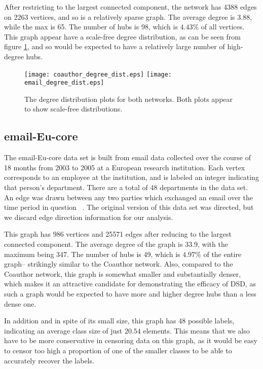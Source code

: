 After restricting to the largest connected component, the network has 4388 edges on 2263 vertices,
and so is a relatively sparse graph. The average degree is 3.88, while the max is 65. The number of
hubs is 98, which is $4.43\%$ of all vertices. This graph appear have a scale-free degree
distribution, as can be seen from figure \ref{fig:real_world_degree_dist}, and so would be expected
to have a relatively large number of high-degree hubs.

\begin{figure}
  \centering
  \texttt{[image: coauthor\_degree\_dist.eps]}
  \texttt{[image: email\_degree\_dist.eps]}
  \caption{The degree distribution plots for both networks. Both plots appear to show scale-free
    distributions.}
  \label{fig:real_world_degree_dist}
\end{figure}


\subsection{email-Eu-core}

The email-Eu-core data set is built from email data collected over the course of 18 months from 2003
to 2005 at a European research institution. Each vertex corresponds to an employee at the
institution, and is labeled an integer indicating that person's department. There are a total of 48
departments in the data set. An edge was drawn between any two parties which exchanged an email over
the time period in question ~\cite{snapnets}. The original version of this data set was directed,
but we discard edge direction information for our analysis.

This graph has 986 vertices and 25571 edges after reducing to the largest connected component. The
average degree of the graph is 33.9, with the maximum being 347. The number of hubs is 49, which is
$4.97\%$ of the entire graph-- strikingly similar to the Coauthor network. Also, compared to the
Coauthor network, this graph is somewhat smaller and substantially denser, which makes it an
attractive candidate for demonstrating the efficacy of DSD, as such a graph would be expected to
have more and higher degree hubs than a less dense one.

In addition and in spite of its small size, this graph has 48 possible labels, indicating an average
class size of just $20.54$ elements. This means that we also have to be more conservative in
censoring data on this graph, as it would be easy to censor too high a proportion of one of the
smaller classes to be able to accurately recover the labels.


